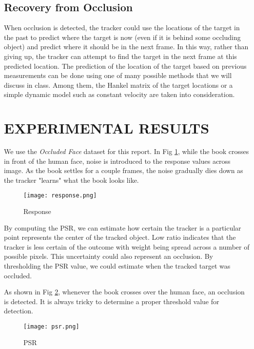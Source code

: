 \documentclass[letterpaper, 10 pt, conference]{ieeeconf}
\begin{document}
\subsection{Recovery from Occlusion}
When occlusion is detected, the tracker could use the locations of the target in the past to predict where the target is now (even if it is behind some occluding object) and predict where it should be in the next frame. In this way, rather than giving up, the tracker can attempt to find the target in the next frame at this predicted location. The prediction of the location of the target based on previous measurements can be done using one of many possible methods that we will discuss in class. Among them, the Hankel matrix of the target locations or a simple dynamic model such as constant velocity are taken into consideration.




\section{EXPERIMENTAL RESULTS}
We use the \textit{Occluded Face} dataset for this report. In Fig \ref{resp}, while the book crosses in front of the human face, noise is introduced to the response values across image. As the book settles for a couple frames, the noise gradually dies down as the tracker "learns" what the book looks like.


\begin{figure}[thpb]
\centering
\texttt{[image: response.png]}
\caption{Response}
\label{resp}
\end{figure}


By computing the PSR, we can estimate how certain the tracker is a particular point represents the center of the tracked object. Low ratio indicates that the tracker is less certain of the outcome with weight being spread across a number of possible pixels. This uncertainty could also represent an occlusion. By thresholding the PSR value, we could estimate when the tracked target was occluded.

As shown in Fig \ref{psr}, whenever the book crosses over the human face, an occlusion is detected. It is always tricky to determine a proper threshold value for detection.


\begin{figure}[thpb]
\centering
\texttt{[image: psr.png]}
\caption{PSR}
\label{psr}
\end{figure}
\end{document}
